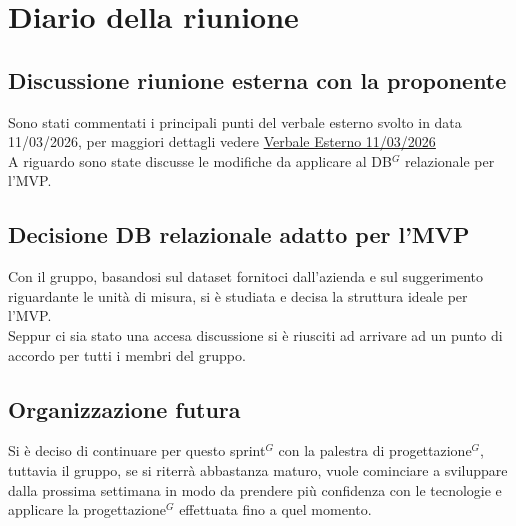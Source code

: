 \section{Diario della riunione}

\subsection{Discussione riunione esterna con la proponente}
Sono stati commentati i principali punti del verbale esterno svolto in data 11/03/2026, per maggiori dettagli vedere \href{https://nullpointersgroup.github.io/Documentazione/output/PB/Verbali%20Esterni/2026-03-11_verbale_esterno.pdf}{Verbale Esterno 11/03/2026}\\
A riguardo sono state discusse le modifiche da applicare al DB$^G$ relazionale per l'MVP.

\subsection{Decisione DB relazionale adatto per l'MVP}
Con il gruppo, basandosi sul dataset fornitoci dall'azienda e sul suggerimento riguardante le unità di misura, si è studiata e decisa la struttura ideale per l'MVP.\\
Seppur ci sia stato una accesa discussione si è riusciti ad arrivare ad un punto di accordo per tutti i membri del gruppo.

\subsection{Organizzazione futura}
Si è deciso di continuare per questo sprint$^G$ con la palestra di progettazione$^G$, tuttavia il gruppo, se si riterrà abbastanza maturo, vuole cominciare a sviluppare dalla prossima settimana in modo da prendere più confidenza con le tecnologie e applicare la progettazione$^G$ effettuata fino a quel momento.